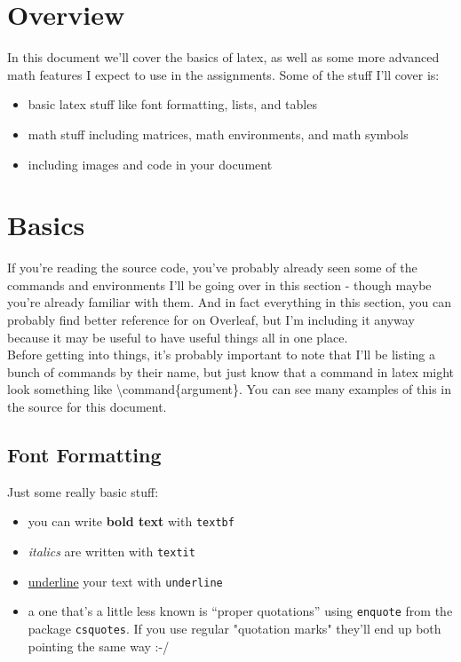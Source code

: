 \documentclass{article}
\begin{document}
\section*{Overview}
In this document we'll cover the basics of latex, as well as some more advanced
math features I expect to use in the assignments. Some of the stuff I'll cover
is:
\begin{itemize}
\item basic latex stuff like font formatting, lists, and tables
\item math stuff including matrices, math environments, and math symbols
\item including images and code in your document
\end{itemize}

\section*{Basics}
If you're reading the source code, you've probably already seen some of the
commands and environments I'll be going over in this section - though maybe
you're already familiar with them. And in fact everything in this section, you
can probably find better reference for on Overleaf, but I'm including it anyway
because it may be useful to have useful things all in one place.~\\

Before getting into things, it's probably important to note that I'll be listing
a bunch of commands by their name, but just know that a command in latex might
look something like \textbackslash command\{argument\}. You can see many
examples of this in the source for this document.

\subsection*{Font Formatting}
Just some really basic stuff: 
\begin{itemize}
\item you can write \textbf{bold text} with \lstinline{textbf}
\item \textit{italics} are written with \lstinline{textit}
\item \underline{underline} your text with \lstinline{underline}
\item a one that's a little less known is \enquote{proper quotations} using
      \lstinline{enquote} from the package \lstinline{csquotes}. If you use
      regular "quotation marks" they'll end up both pointing the same way :-/
\end{itemize}
\end{document}
